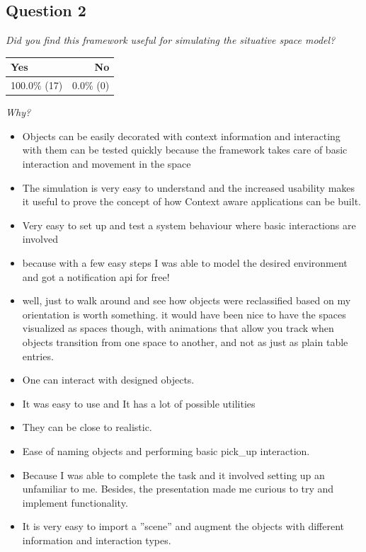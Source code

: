 \subsection{Question 2}\label{question2:2}
\emph{Did you find this framework useful for simulating the situative space model?}
\begin{table}[H]
	\begin{center}
		\small \begin{tabular*}{0.35\columnwidth}{lr}
			\\ \hline \hline
			Yes & No \\ \hline \hline

		 	100.0\% (17) & 0.0\% (0)\\ \hline
		\end{tabular*}
	\end{center}
\end{table}

\emph{Why?}
\begin{itemize}
	\item Objects can be easily decorated with context information and interacting with them can be tested quickly because the framework takes care of basic interaction and movement in the space
	\item The simulation is very easy to understand and the increased usability makes it useful to prove the concept of how Context aware applications can be built.
	\item Very easy to set up and test a system behaviour where basic interactions are involved
	\item because with a few easy steps I was able to model the desired environment and got a notification api for free!
	\item well, just to walk around and see how objects were reclassified based on my orientation is worth something. it would have been nice to have the spaces visualized as spaces though, with animations that allow you track when objects transition from one space to another, and not as just as plain table entries.
	\item One can interact with designed objects.
	\item It was easy to use and It has a lot of possible utilities
	\item They can be close to realistic.
	\item Ease of naming objects and performing basic pick\_up interaction.
	\item Because I was able to complete the task and it involved setting up an unfamiliar to me. Besides, the presentation made me curious to try and implement functionality.
	\item It is very easy to import a ''scene'' and augment the objects with different information and interaction types.
\end{itemize}

